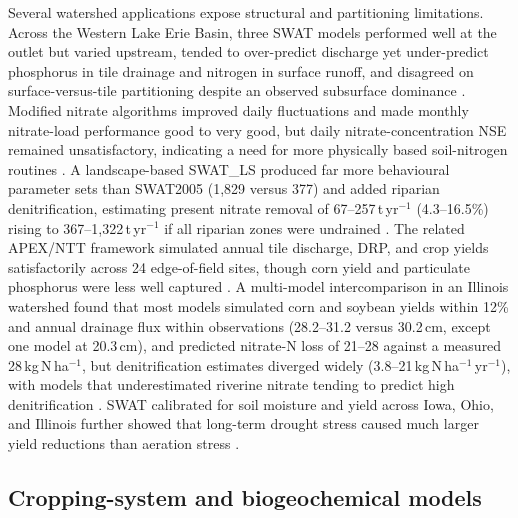 Several watershed applications expose structural and partitioning limitations. Across the Western Lake Erie Basin, three SWAT models performed well at the outlet but varied upstream, tended to over-predict discharge yet under-predict phosphorus in tile drainage and nitrogen in surface runoff, and disagreed on surface-versus-tile partitioning despite an observed subsurface dominance \parencite{Apostel2021}. Modified nitrate algorithms improved daily fluctuations and made monthly nitrate-load performance good to very good, but daily nitrate-concentration NSE remained unsatisfactory, indicating a need for more physically based soil-nitrogen routines \parencite{Ikenberry2017}. A landscape-based SWAT\_LS produced far more behavioural parameter sets than SWAT2005 (1{,}829 versus 377) and added riparian denitrification, estimating present nitrate removal of 67--257\,t\,yr$^{-1}$ (4.3--16.5\%) rising to 367--1{,}322\,t\,yr$^{-1}$ if all riparian zones were undrained \parencite{Hoang2017}. The related APEX/NTT framework simulated annual tile discharge, DRP, and crop yields satisfactorily across 24 edge-of-field sites, though corn yield and particulate phosphorus were less well captured \parencite{Guo2020b}. A multi-model intercomparison in an Illinois watershed found that most models simulated corn and soybean yields within 12\% and annual drainage flux within observations (28.2--31.2 versus 30.2\,cm, except one model at 20.3\,cm), and predicted nitrate-N loss of 21--28 against a measured 28\,kg\,N\,ha$^{-1}$, but denitrification estimates diverged widely (3.8--21\,kg\,N\,ha$^{-1}$\,yr$^{-1}$), with models that underestimated riverine nitrate tending to predict high denitrification \parencite{David2009}. SWAT calibrated for soil moisture and yield across Iowa, Ohio, and Illinois further showed that long-term drought stress caused much larger yield reductions than aeration stress \parencite{Wang2016}.

\subsection{Cropping-system and biogeochemical models}

